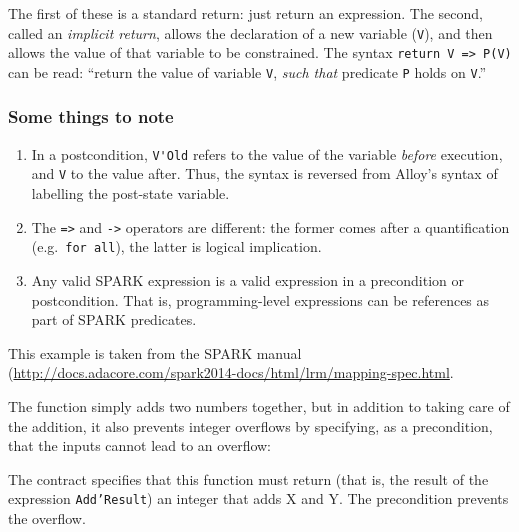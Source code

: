 The first of these is a standard return: just return an expression. The second, called an \emph{implicit return}, allows the declaration of a new variable (\texttt{V}), and then allows the value of that variable to be constrained. The syntax \texttt{return V => P(V)} can be read: ``return the value of variable \texttt{V}, \emph{such that} predicate \texttt{P} holds on \texttt{V}.''

\subsubsection{Some things to note}

\begin{enumerate}

 \item In a postcondition, {\small\verb+V'Old+} refers to the value of the variable {\em before} execution, and {\small\tt V} to the value after. Thus, the syntax is reversed from Alloy's syntax of labelling the post-state variable.


 \item The {\small\tt =>} and {\small\tt ->} operators are different: the former comes after a quantification (e.g.\ {\small\tt for all}), the latter is logical implication.

 \item Any valid SPARK expression is a valid expression in a precondition or postcondition. That is, programming-level expressions can be references as part of SPARK predicates.

\end{enumerate}



\begin{example}
This example is taken from the SPARK manual (\url{http://docs.adacore.com/spark2014-docs/html/lrm/mapping-spec.html}.

The function simply adds two numbers together, but in addition to taking care of the addition, it also prevents integer overflows by specifying, as a precondition, that the inputs cannot lead to an overflow:

\lstset{language=Ada}
\lstset{aboveskip=3mm}


The contract specifies that this function must return (that is, the result of the expression \texttt{Add'Result}) an integer that adds X and Y. The precondition prevents the overflow.
\end{example}

